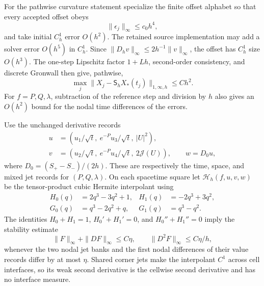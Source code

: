 \documentclass[11pt]{article}
\numberwithin{equation}{section}
\theoremstyle{definition}
\theoremstyle{remark}
\begin{document}
For the pathwise curvature statement specialize the finite offset alphabet so
that every accepted offset obeys
\begin{equation}
 \|\epsilon_j\|_\infty\le c_0h^4,
 \label{eq:supp-gowdy-offset-cap}
\end{equation}
and take initial $C_h^1$ error $O(h^2)$.  The retained source implementation may
add a solver error $O(h^5)$ in $C_h^1$.  Since
$\|D_hv\|_\infty\le2h^{-1}\|v\|_\infty$, the offset has $C_h^1$ size
$O(h^3)$.  The one-step Lipschitz factor $1+Lh$, second-order consistency, and
discrete Gronwall then give, pathwise,
\begin{equation}
 \max_j\|X_j-\mathsf S_hX_*(t_j)\|_{1,\infty,h}\le Ch^2.
 \label{eq:supp-gowdy-pathwise-c1}
\end{equation}
For $f=P,Q,\lambda$, subtraction of the reference step and division by $h$
also gives an $O(h^2)$ bound for the nodal time differences of the errors.

Use the unchanged derivative records
\begin{align}
 u&=\left(u_1/\sqrt t,\ e^{-P}u_3/\sqrt t,\ |U|^2\right),\nonumber\\
 v&=\left(u_2/\sqrt t,\ e^{-P}u_4/\sqrt t,\ 2\mathcal J(U)\right),
 \qquad w=D_0u,
 \label{eq:supp-gowdy-hermite-jets}
\end{align}
where $D_0=(S_+-S_-)/(2h)$.  These are respectively the time, space, and mixed
jet records for $(P,Q,\lambda)$.  On each spacetime square let
$\mathcal H_h(f,u,v,w)$ be the tensor-product cubic Hermite interpolant using
\begin{align*}
 H_0(q)&=2q^3-3q^2+1,&H_1(q)&=-2q^3+3q^2,\\
 G_0(q)&=q^3-2q^2+q,&G_1(q)&=q^3-q^2.
\end{align*}
The identities $H_0+H_1=1$, $H_0'+H_1'=0$, and
$H_0''+H_1''=0$ imply the stability estimate
\begin{equation}
 \|F\|_\infty+\|DF\|_\infty\le C\eta,
 \qquad \|D^2F\|_\infty\le C\eta/h,
 \label{eq:supp-gowdy-hermite-second-jet}
\end{equation}
whenever the two nodal jet banks and the first nodal differences of their value
records differ by at most $\eta$.  Shared corner jets make the interpolant
$C^1$ across cell interfaces, so its weak second derivative is the cellwise
second derivative and has no interface measure.
\end{document}
